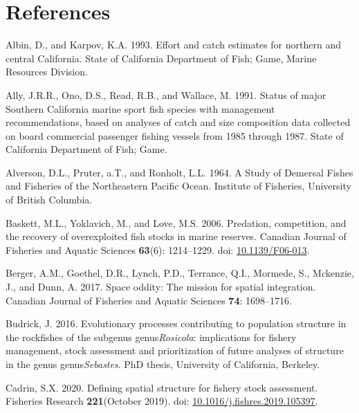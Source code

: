 \documentclass[
  english,
  a4paper,
]{article}
\newlength{\cslhangindent}
\newlength{\cslentryspacingunit} %
\newenvironment{CSLReferences}[2] %
 {%
  \setlength{\parindent}{0pt}
  \ifodd #1
  \let\oldpar\par
  \def\par{\hangindent=\cslhangindent\oldpar}
  \fi
  \setlength{\parskip}{#2\cslentryspacingunit}
 }%
 {}
\begin{document}
\clearpage

\hypertarget{references}{%
\section{References}\label{references}}

\hypertarget{refs}{}
\begin{CSLReferences}{1}{0}
\leavevmode{}%
Albin, D., and Karpov, K.A. 1993. {Effort and catch estimates for northern and central California}. State of California Department of Fish; Game, Marine Resources Division.

\leavevmode{}%
Ally, J.R.R., Ono, D.S., Read, R.B., and Wallace, M. 1991. {Status of major Southern California marine sport fish species with management recommendations, based on analyses of catch and size composition data collected on board commercial passenger fishing vessels from 1985 through 1987}. State of California Department of Fish; Game.

\leavevmode{}%
Alverson, D.L., Pruter, a.T., and Ronholt, L.L. 1964. {A Study of Demersal Fishes and Fisheries of the Northeastern Pacific Ocean}. Institute of Fisheries, University of British Columbia.

\leavevmode{}%
Baskett, M.L., Yoklavich, M., and Love, M.S. 2006. {Predation, competition, and the recovery of overexploited fish stocks in marine reserves}. Canadian Journal of Fisheries and Aquatic Sciences \textbf{63}(6): 1214--1229. doi: \href{https://doi.org/10.1139/F06-013}{10.1139/F06-013}.

\leavevmode{}%
Berger, A.M., Goethel, D.R., Lynch, P.D., Terrance, Q.I., Mormede, S., Mckenzie, J., and Dunn, A. 2017. {Space oddity: The mission for spatial integration}. Canadian Journal of Fisheries and Aquatic Sciences \textbf{74}: 1698--1716.

\leavevmode{}%
Budrick, J. 2016. {Evolutionary processes contributing to population structure in the rockfishes of the subgenus genus\emph{Rosicola}: implications for fishery management, stock assessment and prioritization of future analyses of structure in the genus genus\emph{Sebastes}.} PhD thesis, University of California, Berkeley.

\leavevmode{}%
Cadrin, S.X. 2020. {Defining spatial structure for fishery stock assessment}. Fisheries Research \textbf{221}(October 2019). doi: \href{https://doi.org/10.1016/j.fishres.2019.105397}{10.1016/j.fishres.2019.105397}.


\end{CSLReferences}
\end{document}
